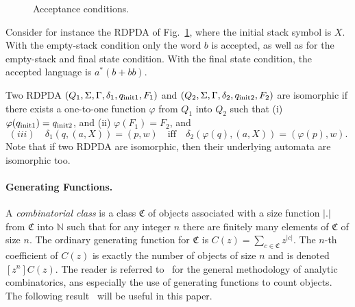 \begin{figure}[h!]
\begin{center}
\end{center}
\caption{Acceptance conditions.}\label{fig:acceptation}
\end{figure}
Consider for instance the RDPDA of Fig.~\ref{fig:acceptation}, where the
initial stack symbol is $X$. With the empty-stack condition only the word
$b$ is accepted, as well as for the empty-stack and final state condition.
With the final state condition, the accepted language is $a^*(b+bb)$.

Two RDPDA $(Q_1,\Sigma,\Gamma,\delta_1,q_{\rm init1},F_1)$
and $(Q_2,\Sigma,\Gamma,\delta_2,q_{\rm init2},F_2)$ are isomorphic if
there exists a one-to-one function $\varphi$ from $Q_1$ into $Q_2$ such that
(i) $\varphi(q_{\rm init1})=q_{\rm init2}$, and (ii) $\varphi(F_1)=F_2$, and
 $$(iii)\quad \delta_1(q,(a,X))=(p,w)\quad \text{iff}\quad \delta_2(\varphi(q),(a,X))=(\varphi(p),w).$$
Note that if two RDPDA are isomorphic, then their underlying automata are
isomorphic too.



\paragraph{Generating Functions.}
A {\it combinatorial class} is a class $\mathfrak{C}$ of objects associated
with a size function $|.|$ from $\mathfrak{C}$ into $\mathbb{N}$ such that
for any integer $n$ there are finitely many elements of $\mathfrak{C}$ of
size $n$. The ordinary generating function for $\mathfrak{C}$ is
$C(z)=\sum_{c\in \mathfrak{C}} z^{|c|}$. The $n$-th coefficient of $C(z)$ is
exactly the number of objects of size $n$ and is denoted $[z^n]C(z)$. The
reader is referred to~\cite{FSbook} for the general methodology of analytic
combinatorics, ans especially the use of generating functions to count
objects. The following result~\cite[Theorem~VIII.8]{FSbook} will be useful
in this paper.

